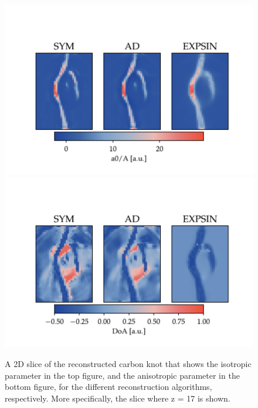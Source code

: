 \begin{figure}[h!]
    \centering

    \includegraphics[trim = {0 0 0 2.0cm}, clip, width = 1\textwidth]{./svg-inkscape/ck_slices_A_svg-tex.pdf}
    \includegraphics[trim = {0 0 0 2.0cm}, clip, width = 1\textwidth]{./svg-inkscape/ck_slices_DoA_svg-tex.pdf}

    \caption{  A 2D slice of the reconstructed carbon knot that shows the isotropic parameter in the top figure, and the anisotropic parameter in the bottom figure, for the different reconstruction algorithms, respectively.
        More specifically, the slice where z = 17 is shown. }
    \label{fig:carbon_knot_reconstruction_2D_coeffs}
\end{figure}

